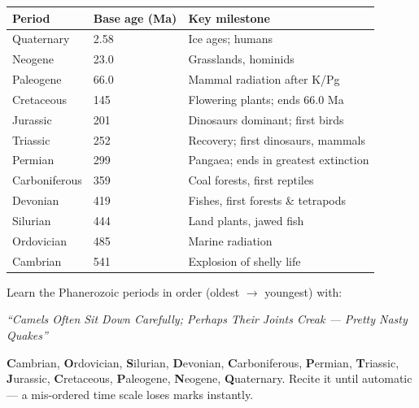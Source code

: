 \documentclass[11pt]{article}
\begin{document}
\begin{center}
\begin{tabularx}{\linewidth}{|l|l|X|}
\hline
\rowcolor{popblueL} \textbf{Period} & \textbf{Base age (Ma)} & \textbf{Key milestone} \\
\hline
Quaternary & 2.58 & Ice ages; humans \\
\hline
Neogene & 23.0 & Grasslands, hominids \\
\hline
Paleogene & 66.0 & Mammal radiation after K/Pg \\
\hline
Cretaceous & 145 & Flowering plants; ends 66.0 Ma \\
\hline
Jurassic & 201 & Dinosaurs dominant; first birds \\
\hline
Triassic & 252 & Recovery; first dinosaurs, mammals \\
\hline
Permian & 299 & Pangaea; ends in greatest extinction \\
\hline
Carboniferous & 359 & Coal forests, first reptiles \\
\hline
Devonian & 419 & Fishes, first forests \& tetrapods \\
\hline
Silurian & 444 & Land plants, jawed fish \\
\hline
Ordovician & 485 & Marine radiation \\
\hline
Cambrian & 541 & Explosion of shelly life \\
\hline
\end{tabularx}
\end{center}

\begin{methode}
Learn the Phanerozoic periods in order (oldest $\rightarrow$ youngest) with:
\begin{center}
\emph{``Camels Often Sit Down Carefully; Perhaps Their Joints Creak --- Pretty Nasty Quakes''}
\end{center}
\textbf{C}ambrian, \textbf{O}rdovician, \textbf{S}ilurian, \textbf{D}evonian, \textbf{C}arboniferous, \textbf{P}ermian, \textbf{T}riassic, \textbf{J}urassic, \textbf{C}retaceous, \textbf{P}aleogene, \textbf{N}eogene, \textbf{Q}uaternary. Recite it until automatic --- a mis-ordered time scale loses marks instantly.
\end{methode}
\end{document}
